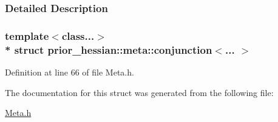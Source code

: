 \subsubsection{Detailed Description}
\subsubsection*{template$<$class...$>$\\*
struct prior\+\_\+hessian\+::meta\+::conjunction$<$... $>$}



Definition at line 66 of file Meta.\+h.



The documentation for this struct was generated from the following file\+:\begin{DoxyCompactItemize}
\item 
\hyperlink{Meta_8h}{Meta.\+h}\end{DoxyCompactItemize}
